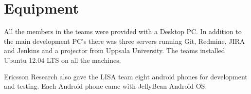 \section{Equipment}

All the members in the teams were provided with a Desktop PC. In addition to the main development PC's there was three servers running Git, Redmine, JIRA and Jenkins and a projector from Uppsala University. The teams installed Ubuntu 12.04 LTS on all the machines.

Ericsson Research also gave the LISA team eight android phones for development and testing. Each Android phone came with JellyBean Android OS. 




